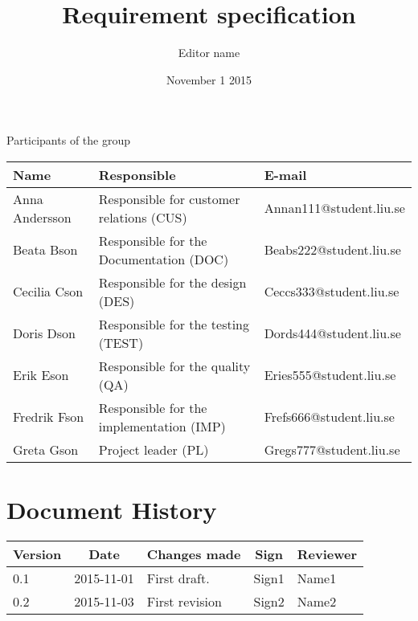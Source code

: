 \documentclass[10pt,oneside,english]{lips}
\title{Requirement specification}
\author{Editor name}
\date{November 1 2015}
\begin{document}
\maketitle

\cleardoublepage
\makeprojectid

\begin{center}
  \Large Participants of the group
\end{center}
\begin{center}
  \begin{tabular}{|l|l|l|}
    \hline
    \textbf{Name} & \textbf{Responsible} & \textbf{E-mail}\\
    \hline
    Anna Andersson & Responsible for customer relations (CUS) & Annan111@student.liu.se\\
    \hline
    Beata Bson & Responsible for the Documentation (DOC) & Beabs222@student.liu.se\\
    \hline
    Cecilia Cson & Responsible for the design (DES) & Ceccs333@student.liu.se\\
    \hline
    Doris Dson & Responsible for the testing (TEST) & Dords444@student.liu.se\\
    \hline
    Erik Eson & Responsible for the quality (QA) & Eries555@student.liu.se\\
    \hline
    Fredrik Fson & Responsible for the implementation (IMP) & Frefs666@student.liu.se\\
    \hline
    Greta Gson & Project leader (PL) & Gregs777@student.liu.se\\
    \hline
  \end{tabular}
\end{center}

\cleardoublepage
\tableofcontents

\cleardoublepage
\section*{Document History}
\begin{tabular}{p{}|p{}|p{}|p{}|p{}} 
  \multicolumn{1}{c}{\bfseries Version} & 
  \multicolumn{1}{|c}{\bfseries Date} & 
  \multicolumn{1}{|c}{\bfseries Changes made} & 
  \multicolumn{1}{|c}{\bfseries Sign} & 
  \multicolumn{1}{|c}{\bfseries Reviewer}\\
  \hline
  \hline
  0.1 & 2015-11-01 & First draft. & Sign1 & Name1   \\
  \hline
  0.2 & 2015-11-03 & First revision & Sign2 & Name2   \\
  \hline
\end{tabular}
\end{document}
